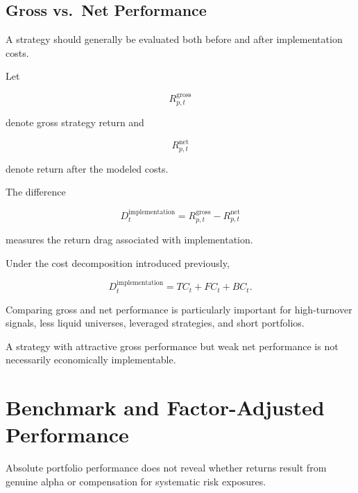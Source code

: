 \documentclass[11pt,a4paper]{article}
\begin{document}
\subsection{Gross vs.\ Net Performance}

A strategy should generally be evaluated both before and after implementation
costs.

Let

\begin{equation}
R_{p,t}^{\mathrm{gross}}
\end{equation}

denote gross strategy return and

\begin{equation}
R_{p,t}^{\mathrm{net}}
\end{equation}

denote return after the modeled costs.

The difference

\begin{equation}
\boxed{
D_t^{\mathrm{implementation}}
=
R_{p,t}^{\mathrm{gross}}
-
R_{p,t}^{\mathrm{net}}
}
\end{equation}

measures the return drag associated with implementation.

Under the cost decomposition introduced previously,

\begin{equation}
\boxed{
D_t^{\mathrm{implementation}}
=
TC_t
+
FC_t
+
BC_t.
}
\end{equation}

Comparing gross and net performance is particularly important for high-turnover
signals, less liquid universes, leveraged strategies, and short portfolios.

A strategy with attractive gross performance but weak net performance is not
necessarily economically implementable.


\section{Benchmark and Factor-Adjusted Performance}
\label{sec:benchmark_factor_adjusted_performance}

Absolute portfolio performance does not reveal whether returns result from
genuine alpha or compensation for systematic risk exposures.
\end{document}
